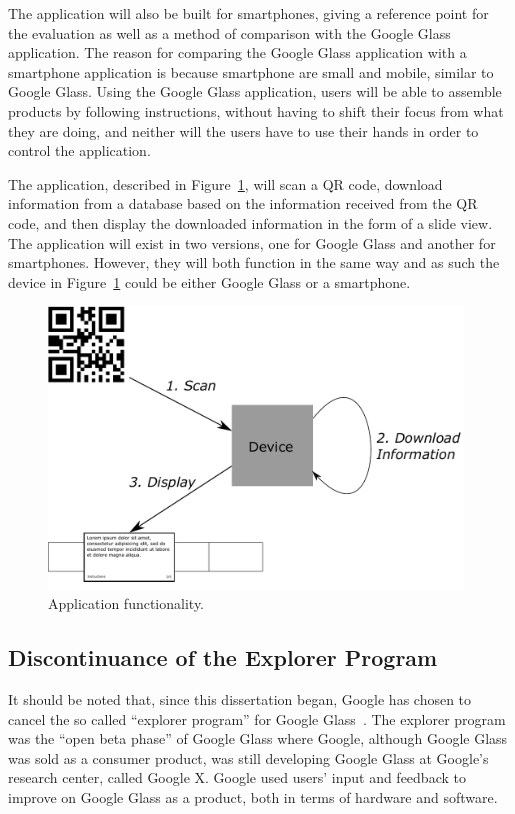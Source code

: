 The application will also be built for smartphones, giving a reference point for the evaluation as well as a method of comparison with the Google Glass application. The reason for comparing the Google Glass application with a smartphone application is because smartphone are small and mobile, similar to Google Glass. Using the Google Glass application, users will be able to assemble products by following instructions, without having to shift their focus from what they are doing, and neither will the users have to use their hands in order to control the application.

The application, described in Figure~\ref{projectmapLightVersion}, will scan a QR code, download information from a database based on the information received from the QR code, and then display the downloaded information in the form of a slide view. The application will exist in two versions, one for Google Glass and another for smartphones. However, they will both function in the same way and as such the device in Figure~\ref{projectmapLightVersion} could be either Google Glass or a smartphone.

	\begin{figure}[ht!]
		\centering
		\includegraphics[width=110mm]{images/projectmapLightVersion}
		\caption{Application functionality.}
		\label{projectmapLightVersion}
	\end{figure}

\subsection{Discontinuance of the Explorer Program}
It should be noted that, since this dissertation began, Google has chosen to cancel the so called ``explorer program'' for Google Glass~\cite{glassDiscontinued}. The explorer program was the ``open beta phase'' of Google Glass where Google, although Google Glass was sold as a consumer product, was still developing Google Glass at Google's research center, called Google X. Google used users' input and feedback to improve on Google Glass as a product, both in terms of hardware and software.

